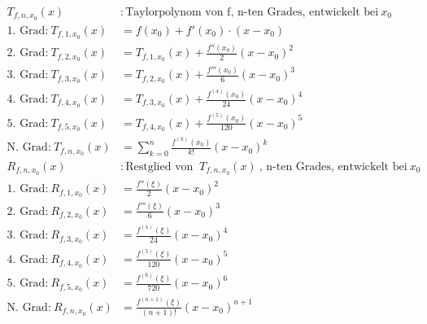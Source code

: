 \documentclass[12pt]{article}
\begin{document}

\noindent

    \begin{tcolorbox}[
    colback=Red!5!white,
    colframe=Red!75!black,
    title={\centering Taylor}]
    \begin{align*}
        T_{f,n,x_0}(x) &: \text{Taylorpolynom von f, n-ten Grades, entwickelt bei} \: x_0 \\
        \text{1. Grad:} \: T_{f,1,x_0}(x) &= f(x_0) + f'(x_0) \cdot (x-x_0) \\
        \text{2. Grad:} \: T_{f,2,x_0}(x) &= T_{f,1,x_0}(x) + \frac{f''(x_0)}{2}(x-x_0)^2 \\
        \text{3. Grad:} \: T_{f,3,x_0}(x) &= T_{f,2,x_0}(x) + \frac{f'''(x_0)}{6}(x-x_0)^3 \\
        \text{4. Grad:} \: T_{f,4,x_0}(x) &= T_{f,3,x_0}(x) + \frac{f^{(4)}(x_0)}{24}(x-x_0)^4 \\
        \text{5. Grad:} \: T_{f,5,x_0}(x) &= T_{f,4,x_0}(x) + \frac{f^{(5)}(x_0)}{120}(x-x_0)^5 \\
        \text{N. Grad:} \: T_{f,n,x_0}(x) &= \sum_{k=0}^n \frac{f^{(k)}(x_0)}{k!}(x-x_0)^k \\
        R_{f,n,x_0}(x) &: \text{Restglied von } \: T_{f,n,x_0}(x) \: \text{, n-ten Grades, entwickelt bei} \: x_0 \\
        \text{1. Grad:} \: R_{f,1,x_0}(x) &= \frac{f''(\xi)}{2}(x-x_0)^2 \\
        \text{2. Grad:} \: R_{f,2,x_0}(x) &= \frac{f'''(\xi)}{6}(x-x_0)^3 \\
        \text{3. Grad:} \: R_{f,3,x_0}(x) &= \frac{f^{(4)}(\xi)}{24}(x-x_0)^4 \\
        \text{4. Grad:} \: R_{f,4,x_0}(x) &= \frac{f^{(5)}(\xi)}{120}(x-x_0)^5 \\
        \text{5. Grad:} \: R_{f,5,x_0}(x) &= \frac{f^{(6)}(\xi)}{720}(x-x_0)^6 \\
        \text{N. Grad:} \: R_{f,n,x_0}(x) &= \frac{f^{(n+1)}(\xi)}{(n+1)!}(x-x_0)^{n+1} \\
        \end{align*}
    \end{tcolorbox}
\end{document}
